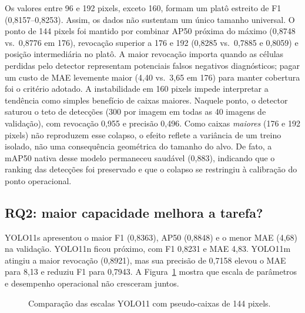 Os valores entre 96 e 192 pixels, exceto 160, formam um plat\^o estreito de F1
(0,8157--0,8253). Assim, os dados n\~ao sustentam um \'unico tamanho universal.
O ponto de 144 pixels foi mantido por combinar AP50 pr\'oxima do m\'aximo
(0,8748 vs.\ 0,8776 em 176), revoca\c{c}\~ao superior a 176 e 192
(0,8285 vs.\ 0,7885 e 0,8059) e posi\c{c}\~ao intermedi\'aria no plat\^o. A maior
revoca\c{c}\~ao importa quando as c\'elulas perdidas pelo detector representam
potenciais falsos negativos diagn\'osticos; pagar um custo de MAE levemente
maior (4,40 vs.\ 3,65 em 176) para manter cobertura foi o crit\'erio adotado.
A instabilidade em 160 pixels impede interpretar a tend\^encia como simples
benef\'icio de caixas maiores. Naquele ponto, o detector saturou o teto de
detec\c{c}\~oes (300 por imagem em todas as 40 imagens de valida\c{c}\~ao), com
revoca\c{c}\~ao 0,955 e precis\~ao 0,496. Como caixas \emph{maiores} (176 e 192
pixels) n\~ao reproduzem esse colapso, o efeito reflete a vari\^ancia de um treino
isolado, n\~ao uma consequ\^encia geom\'etrica do tamanho do alvo. De fato, a
mAP50 nativa desse modelo permaneceu saud\'avel (0,883), indicando que o ranking
das detec\c{c}\~oes foi preservado e que o colapso se restringiu \`a calibra\c{c}\~ao
do ponto operacional.

\FloatBarrier
\subsection{RQ2: maior capacidade melhora a tarefa?}

YOLO11s apresentou o maior F1 (0,8363), AP50 (0,8848) e o menor MAE (4,68) na
valida\c{c}\~ao. YOLO11n ficou pr\'oximo, com F1 0,8231 e MAE 4,83. YOLO11m
atingiu a maior revoca\c{c}\~ao (0,8921), mas sua precis\~ao de 0,7158 elevou o
MAE para 8,13 e reduziu F1 para 0,7943. A Figura~\ref{fig:modelos-pgf} mostra
que escala de par\^ametros e desempenho operacional n\~ao cresceram juntos.

\begin{figure}[htbp]
\centering
{}
\caption{Compara\c{c}\~ao das escalas YOLO11 com pseudo-caixas de 144 pixels.}
\label{fig:modelos-pgf}
\end{figure}

